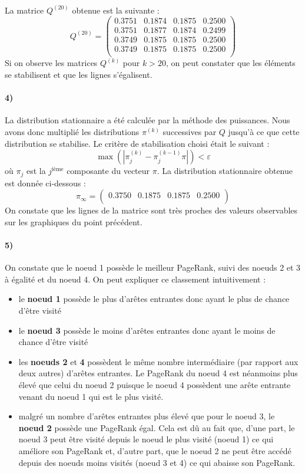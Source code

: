 \documentclass[a4paper,titlepage]{report}
\begin{document}
\paragraph{}
La matrice $Q^{(20)}$ obtenue est la suivante :
\[
Q^{(20)} = 
\begin{pmatrix}
 0.3751 & 0.1874 & 0.1875 & 0.2500\\
 0.3751 & 0.1877 & 0.1874 & 0.2499\\
 0.3749 & 0.1875 & 0.1875 & 0.2500\\
 0.3749 & 0.1875 & 0.1875 & 0.2500\\
\end{pmatrix}
\]
Si on observe les matrices $Q^{(k)}$ pour $k> 20$, on peut constater que les éléments se stabilisent et que les lignes s'égalisent. 
\paragraph{4)} La distribution stationnaire a été calculée par la méthode des puissances. Nous avons donc multiplié les distributions $\pi^{(k)}$ successives par $Q$ jusqu'à ce que cette distribution se stabilise. Le critère de stabilisation choisi était le suivant : 
\[
\max\left(\left|\pi_j^{(k)} - \pi_j^{(k - 1)}\pi\right|\right) < \varepsilon
\]
où $\pi_j$ est la $j^{\text{ième}}$ composante du vecteur $\pi$. La distribution stationnaire obtenue est donnée ci-dessous :
\[
\pi_\infty = 
\begin{pmatrix}
0.3750 &
0.1875 &
0.1875 &
0.2500 \\
\end{pmatrix}
\]
On constate que les lignes de la matrice sont très proches des valeurs observables sur les graphiques du point précédent.
\paragraph{5)} On constate que le noeud 1 possède le meilleur PageRank, suivi des noeuds 2 et 3 à égalité et du noeud 4. On peut expliquer ce classement intuitivement : 
\begin{itemize}
	\item le \textbf{noeud 1} possède le plus d'arêtes entrantes donc ayant le plus de chance d'être visité
	\item le \textbf{noeud 3} possède le moins d'arêtes entrantes donc ayant le moins de chance d'être visité
	\item les \textbf{noeuds 2} et \textbf{4} possèdent le même nombre intermédiaire (par rapport aux deux autres) d'arêtes entrantes. Le PageRank du noeud 4 est néanmoins plus élevé que celui du noeud 2 puisque le noeud 4 possèdent une arête entrante venant du noeud 1 qui est le plus visité.
	\item malgré un nombre d'arêtes entrantes plus élevé que pour le noeud 3, le \textbf{noeud 2} possède une PageRank égal. Cela est dû au fait que, d'une part, le noeud 3 peut être visité depuis le noeud le plus visité (noeud 1) ce qui améliore son PageRank et, d'autre part, que le noeud 2 ne peut être accédé depuis des noeuds moins visités (noeud 3 et 4) ce qui abaisse son PageRank. 
\end{itemize} 
\end{document}
